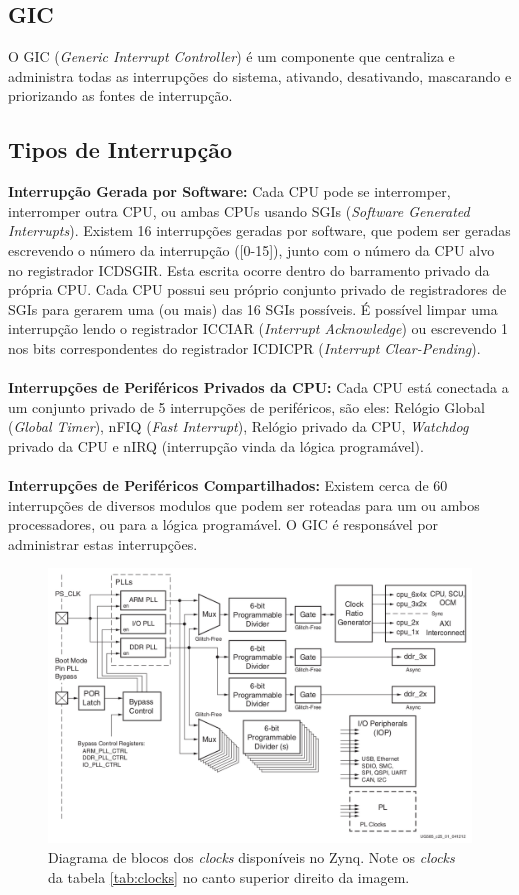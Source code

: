 \subsection{GIC}
O GIC (\emph{Generic Interrupt Controller}) é um componente que centraliza e administra todas as interrupções do sistema, ativando, desativando, mascarando e priorizando as fontes de interrupção.


\subsection{Tipos de Interrupção} %
\label{sec:interrupt}
\textbf{Interrupção Gerada por Software: }
Cada CPU pode se interromper, interromper outra CPU, ou ambas CPUs usando SGIs (\emph{Software Generated Interrupts}). Existem 16 interrupções geradas por software, que podem ser geradas escrevendo o número da interrupção ([0-15]), junto com o número da CPU alvo no registrador ICDSGIR. Esta escrita ocorre dentro do barramento privado da própria CPU. Cada CPU possui seu próprio conjunto privado de registradores de SGIs para gerarem uma (ou mais) das 16 SGIs possíveis. É possível limpar uma interrupção lendo o registrador ICCIAR (\emph{Interrupt Acknowledge}) ou escrevendo 1 nos bits correspondentes do registrador ICDICPR (\emph{Interrupt Clear-Pending}).
\\\\
\textbf{Interrupções de Periféricos Privados da CPU: }
Cada CPU está conectada a um conjunto privado de 5 interrupções de periféricos, são eles: Relógio Global (\emph{Global Timer}), nFIQ (\emph{Fast Interrupt}), Relógio privado da CPU, \emph{Watchdog} privado da CPU e nIRQ (interrupção vinda da lógica programável).
\\\\
\textbf{Interrupções de Periféricos Compartilhados: }
Existem cerca de 60 interrupções de diversos modulos que podem ser roteadas para um ou ambos processadores, ou para a lógica programável. O GIC é responsável por administrar estas interrupções.

\begin{figure}[ht!]
	\centerline{
    \includegraphics[width=13cm]{figuras/clocks}
	}
    \caption{Diagrama de blocos dos \emph{clocks} disponíveis no Zynq. Note os \emph{clocks} da tabela \ref{tab:clocks} no canto superior direito da imagem.}
\end{figure}

